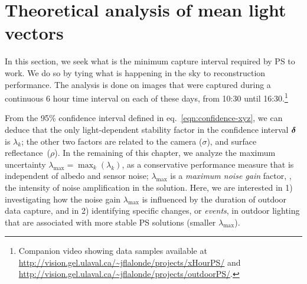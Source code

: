 

\section{Theoretical analysis of mean light vectors}
\label{sec:ch1_analysis}

In this section, we seek what is the minimum capture interval required by PS to work. We do so by tying what is happening in the sky to reconstruction performance. The analysis is done on images that were captured during a continuous 6 hour time interval on each of these days, from 10:30 until 16:30.\footnote{Companion video showing data samples available at \url{http://vision.gel.ulaval.ca/~jflalonde/projects/xHourPS/} and \url{http://vision.gel.ulaval.ca/~jflalonde/projects/outdoorPS/}.} 

From the 95\% confidence interval defined in eq.~\eqref{eqn:confidence-xyz}, we can deduce that the only light-dependent stability factor in the confidence interval $\boldsymbol \delta$ is $\lambda_k$; the other two factors are related to the camera ($\sigma$), and surface reflectance~($\rho$). In the remaining of this chapter, we analyze the maximum uncertainty \mbox{$\lambda_\text{max} = \max_k(\lambda_k)$}, as a conservative performance measure that is independent of albedo and sensor noise; $\lambda_\text{max}$ is a {\em maximum noise gain} factor, \ie, the intensity of noise amplification in the solution. Here, we are interested in 1) investigating how the noise gain $\lambda_\text{max}$ is influenced by the duration of outdoor data capture, and in 2) identifying specific changes, or {\em events}, in outdoor lighting that are associated with more stable PS solutions (smaller $\lambda_\text{max}$).

